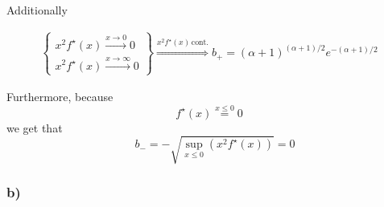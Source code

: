 \documentclass[
]{article}
\begin{document}
Additionally

\begin{align*}
\begin{Bmatrix}
x^2f^{\star}(x) \overset{x \rightarrow 0}{\longrightarrow} 0 \\
x^2f^{\star}(x) \overset{x \rightarrow \infty}{\longrightarrow} 0
\end{Bmatrix} 
\overset{x^2f^{\star}(x) \, \text{cont.}}{\Longrightarrow} b_+ = (\alpha+1)^{(\alpha+1)/2}e^{-(\alpha+1)/2}
\end{align*}

Furthermore, because \[
f^{\star}(x) \overset{x≤0}{=} 0
\] we get that \[
\quad b_- = -\sqrt{\sup_{x≤0}(x^2f^{\star}(x))} = 0
\]

\hypertarget{b-1}{%
\subsubsection{b)}\label{b-1}}
\end{document}
